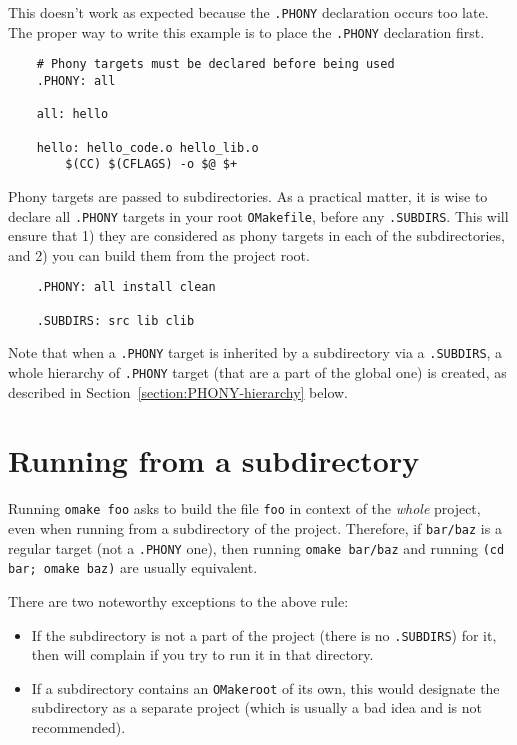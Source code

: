 This doesn't work as expected because the \verb+.PHONY+ declaration occurs too late.  The proper way
to write this example is to place the \verb+.PHONY+ declaration first.

\begin{verbatim}
    # Phony targets must be declared before being used
    .PHONY: all

    all: hello

    hello: hello_code.o hello_lib.o
        $(CC) $(CFLAGS) -o $@ $+
\end{verbatim}

Phony targets are passed to subdirectories.  As a practical matter, it is wise to declare all
\verb+.PHONY+ targets in your root \verb+OMakefile+, before any \verb+.SUBDIRS+.  This will ensure
that 1) they are considered as phony targets in each of the subdirectories, and 2) you can build them
from the project root.

\begin{verbatim}
    .PHONY: all install clean

    .SUBDIRS: src lib clib
\end{verbatim}

Note that when a \verb+.PHONY+ target is inherited by a subdirectory via a \verb+.SUBDIRS+, a whole
hierarchy of \verb+.PHONY+ target (that are a part of the global one) is created, as described in
Section~\ref{section:PHONY-hierarchy} below.

\section{Running \OMake{} from a subdirectory}
\label{section:running-from-subdir}
Running \verb+omake foo+ asks \OMake{} to build the file \verb+foo+ in context of the \emph{whole}
project, even when running from a subdirectory of the project. Therefore, if \verb+bar/baz+ is a
regular target (not a \verb+.PHONY+ one), then running \verb+omake bar/baz+ and running
\verb+(cd bar; omake baz)+ are usually equivalent.

There are two noteworthy exceptions to the above rule:
\begin{itemize}
\item If the subdirectory is not a part of the project (there is no \verb+.SUBDIRS+) for it, then
\OMake{} will complain if you try to run it in that directory.
\item If a subdirectory contains an \verb+OMakeroot+ of its own, this would designate
the subdirectory as a separate project (which is usually a bad idea and is not recommended).
\end{itemize}

